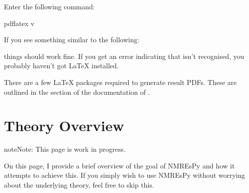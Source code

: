 \documentclass[letterpaper,10pt,english]{sphinxmanual}
\begin{document}
\sphinxAtStartPar
Enter the following command:

\begin{sphinxVerbatim}[commandchars=\\\{\}]
\PYGZdl{} pdflatex \PYGZhy{}v
\end{sphinxVerbatim}

\sphinxAtStartPar
If you see something similar to the following:

\begin{sphinxVerbatim}[commandchars=\\\{\}]
    
  
       

\end{sphinxVerbatim}

\sphinxAtStartPar
things should work fine. If you get an error indicating that 
isn’t recognised, you probably haven’t got LaTeX installed.

\sphinxAtStartPar
There are a few LaTeX packages required to generate result PDFs. These
are outlined in the  section of the documentation of
{\hyperref[\detokenize{references/write:nmrespy.write.write_result}]{}}.




\chapter{Theory Overview}
\label{\detokenize{theory_overview:theory-overview}}\label{\detokenize{theory_overview::doc}}
\begin{sphinxadmonition}{note}{Note:}
\sphinxAtStartPar
This page is work in progress.
\end{sphinxadmonition}

\sphinxAtStartPar
On this page, I provide a brief overview of the goal of NMR\sphinxhyphen{}EsPy and how
it attempts to achieve this. If you simply wish to use NMR\sphinxhyphen{}EsPy without
worrying about the underlying theory, feel free to skip this.
\end{document}
